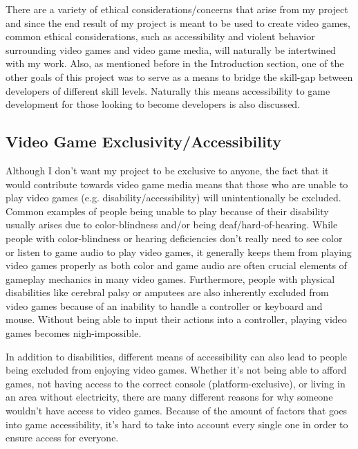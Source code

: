 \documentclass[10pt,twocolumn]{article}
\begin{document}
There are a variety of ethical considerations/concerns that arise from my project and since the end result of my project is meant to be used to create video games, common ethical considerations, such as accessibility and violent behavior surrounding video games and video game media, will naturally be intertwined with my work. Also, as mentioned before in the Introduction section, one of the other goals of this project was to serve as a means to bridge the skill-gap between developers of different skill levels. Naturally this means accessibility to game development for those looking to become developers is also discussed. 

\subsection{Video Game Exclusivity/Accessibility}

Although I don't want my project to be exclusive to anyone, the fact that it would contribute towards video game media means that those who are unable to play video games (e.g. disability/accessibility) will unintentionally be excluded. Common examples of people being unable to play because of their disability usually arises due to color-blindness and/or being deaf/hard-of-hearing. While people with color-blindness or hearing deficiencies don't really need to see color or listen to game audio to play video games, it generally keeps them from playing video games properly as both color and game audio are often crucial elements of gameplay mechanics in many video games. Furthermore, people with physical disabilities like cerebral palsy or amputees are also inherently excluded from video games because of an inability to handle a controller or keyboard and mouse. Without being able to input their actions into a controller, playing video games becomes nigh-impossible.

In addition to disabilities, different means of accessibility can also lead to people being excluded from enjoying video games. Whether it's not being able to afford games, not having access to the correct console (platform-exclusive), or living in an area without electricity, there are many different reasons for why someone wouldn't have access to video games. Because of the amount of factors that goes into game accessibility, it's hard to take into account every single one in order to ensure access for everyone.
\end{document}
